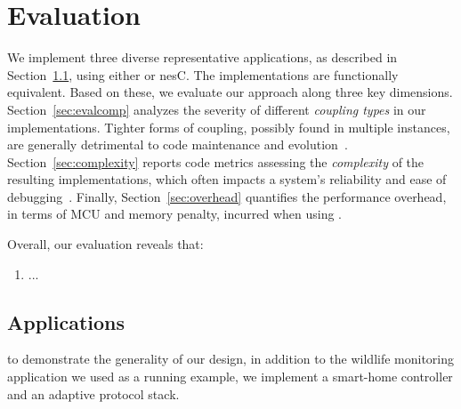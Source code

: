 \section{Evaluation}\label{sec:eval}

We implement three diverse representative applications, as described
in Section~\ref{sec:scenarios}, using either \conesc or nesC. The
implementations are functionally equivalent. Based on these, we
evaluate our approach along three key
dimensions. Section~\ref{sec:evalcomp} analyzes the severity of
different \emph{coupling types} in our implementations. Tighter forms
of coupling, possibly found in multiple instances, are generally
detrimental to code maintenance and
evolution~\cite{stevens79}. Section~\ref{sec:complexity} reports code
metrics assessing the \emph{complexity} of the resulting
implementations, which often impacts a system's reliability and ease
of debugging~\cite{pressman01}. Finally, Section~\ref{sec:overhead}
quantifies the performance overhead, in terms of MCU and memory
penalty, incurred when using \conesc.

Overall, our evaluation reveals that:
\begin{enumerate}
\item ...
\end{enumerate}


\subsection{Applications}\label{sec:scenarios}

to demonstrate the generality of our design, in addition to the
wildlife monitoring application we used as a running example, we
implement a smart-home controller and an adaptive protocol stack.


